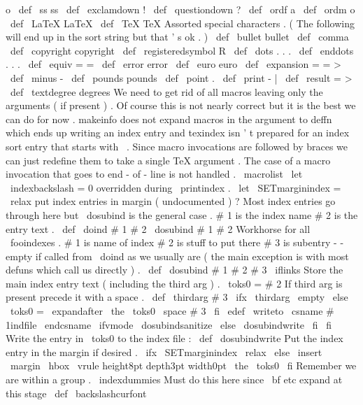 {{{{o
}
%
\
def
\
ss
{
ss
}
%
\
def
\
exclamdown
{
!
}
%
\
def
\
questiondown
{
?
}
%
\
def
\
ordf
{
a
}
%
\
def
\
ordm
{
o
}
%
%
\
def
\
LaTeX
{
LaTeX
}
%
\
def
\
TeX
{
TeX
}
%
%
%
Assorted
special
characters
.
%
(
The
following
{
}
will
end
up
in
the
sort
string
but
that
'
s
ok
.
)
\
def
\
bullet
{
bullet
}
%
\
def
\
comma
{
}
%
\
def
\
copyright
{
copyright
}
%
\
def
\
registeredsymbol
{
R
}
%
\
def
\
dots
{
.
.
.
}
%
\
def
\
enddots
{
.
.
.
}
%
\
def
\
equiv
{
=
=
}
%
\
def
\
error
{
error
}
%
\
def
\
euro
{
euro
}
%
\
def
\
expansion
{
=
=
>
}
%
\
def
\
minus
{
-
}
%
\
def
\
pounds
{
pounds
}
%
\
def
\
point
{
.
}
%
\
def
\
print
{
-
|
}
%
\
def
\
result
{
=
>
}
%
\
def
\
textdegree
{
degrees
}
%
%
%
We
need
to
get
rid
of
all
macros
leaving
only
the
arguments
(
if
present
)
.
%
Of
course
this
is
not
nearly
correct
but
it
is
the
best
we
can
do
for
now
.
%
makeinfo
does
not
expand
macros
in
the
argument
to
deffn
which
ends
up
%
writing
an
index
entry
and
texindex
isn
'
t
prepared
for
an
index
sort
entry
%
that
starts
with
\
.
%
%
Since
macro
invocations
are
followed
by
braces
we
can
just
redefine
them
%
to
take
a
single
TeX
argument
.
The
case
of
a
macro
invocation
that
%
goes
to
end
-
of
-
line
is
not
handled
.
%
\
macrolist
}
\
let
\
indexbackslash
=
0
%
overridden
during
\
printindex
.
\
let
\
SETmarginindex
=
\
relax
%
put
index
entries
in
margin
(
undocumented
)
?
%
Most
index
entries
go
through
here
but
\
dosubind
is
the
general
case
.
%
#
1
is
the
index
name
#
2
is
the
entry
text
.
\
def
\
doind
#
1
#
2
{
\
dosubind
{
#
1
}
{
#
2
}
{
}
}
%
Workhorse
for
all
\
fooindexes
.
%
#
1
is
name
of
index
#
2
is
stuff
to
put
there
#
3
is
subentry
-
-
%
empty
if
called
from
\
doind
as
we
usually
are
(
the
main
exception
%
is
with
most
defuns
which
call
us
directly
)
.
%
\
def
\
dosubind
#
1
#
2
#
3
{
%
\
iflinks
{
%
%
Store
the
main
index
entry
text
(
including
the
third
arg
)
.
\
toks0
=
{
#
2
}
%
%
If
third
arg
is
present
precede
it
with
a
space
.
\
def
\
thirdarg
{
#
3
}
%
\
ifx
\
thirdarg
\
empty
\
else
\
toks0
=
\
expandafter
{
\
the
\
toks0
\
space
#
3
}
%
\
fi
%
\
edef
\
writeto
{
\
csname
#
1indfile
\
endcsname
}
%
%
\
ifvmode
\
dosubindsanitize
\
else
\
dosubindwrite
\
fi
}
%
\
fi
}
%
Write
the
entry
in
\
toks0
to
the
index
file
:
%
\
def
\
dosubindwrite
{
%
%
Put
the
index
entry
in
the
margin
if
desired
.
\
ifx
\
SETmarginindex
\
relax
\
else
\
insert
\
margin
{
\
hbox
{
\
vrule
height8pt
depth3pt
width0pt
\
the
\
toks0
}
}
%
\
fi
%
%
Remember
we
are
within
a
group
.
\
indexdummies
%
Must
do
this
here
since
\
bf
etc
expand
at
this
stage
\
def
\
backslashcurfont
}}}
